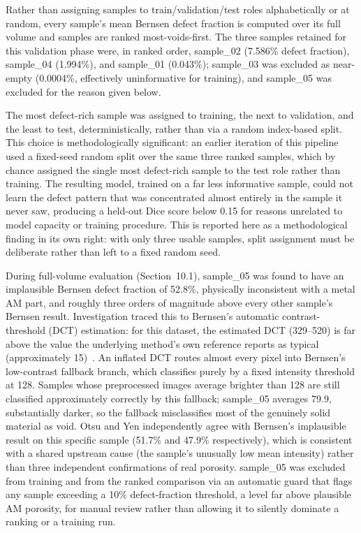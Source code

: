 Rather than assigning samples to train/validation/test roles alphabetically or at random, every
sample's mean Bernsen defect fraction is computed over its full volume and samples are ranked
most-voids-first. The three samples retained for this validation phase were, in ranked order,
sample\_02 (7.586\% defect fraction), sample\_04 (1.994\%), and sample\_01 (0.043\%); sample\_03 was
excluded as near-empty (0.0004\%, effectively uninformative for training), and sample\_05 was
excluded for the reason given below.

The most defect-rich sample was assigned to training, the next to validation, and the least to test,
deterministically, rather than via a random index-based split. This choice is methodologically
significant: an earlier iteration of this pipeline used a fixed-seed random split over the same three
ranked samples, which by chance assigned the single most defect-rich sample to the test role rather
than training. The resulting model, trained on a far less informative sample, could not learn the
defect pattern that was concentrated almost entirely in the sample it never saw, producing a held-out
Dice score below 0.15 for reasons unrelated to model capacity or training procedure. This is reported
here as a methodological finding in its own right: with only three usable samples, split assignment
must be deliberate rather than left to a fixed random seed.

During full-volume evaluation (Section~10.1), sample\_05 was found to have an implausible Bernsen
defect fraction of 52.8\%, physically inconsistent with a metal AM part, and roughly three orders of
magnitude above every other sample's Bernsen result. Investigation traced this to Bernsen's automatic
contrast-threshold (DCT) estimation: for this dataset, the estimated DCT (329--520) is far above the
value the underlying method's own reference reports as typical (approximately 15)~\citep{Kim2017}.
An inflated DCT routes almost every pixel into Bernsen's low-contrast fallback branch, which
classifies purely by a fixed intensity threshold at 128. Samples whose preprocessed images average
brighter than 128 are still classified approximately correctly by this fallback; sample\_05 averages
79.9, substantially darker, so the fallback misclassifies most of the genuinely solid material as
void. Otsu and Yen independently agree with Bernsen's implausible result on this specific sample
(51.7\% and 47.9\% respectively), which is consistent with a shared upstream cause (the sample's
unusually low mean intensity) rather than three independent confirmations of real porosity.
sample\_05 was excluded from training and from the ranked comparison via an automatic guard that
flags any sample exceeding a 10\% defect-fraction threshold, a level far above plausible AM porosity,
for manual review rather than allowing it to silently dominate a ranking or a training run.

